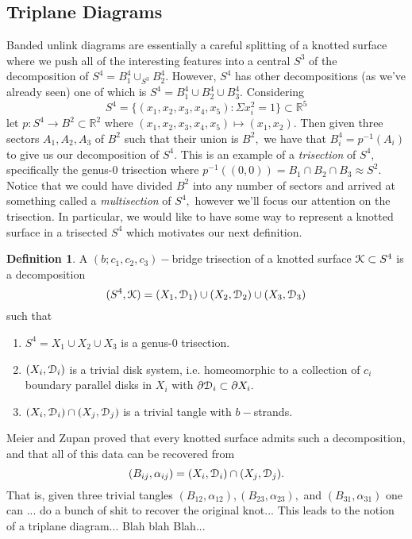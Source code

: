 \documentclass[a4paper, 12 pt, reqno]{amsart}
\theoremstyle{definition}
\newtheorem{definition}[theorem]{Definition}
\theoremstyle{remark}
\begin{document}
\subsection{Triplane Diagrams}
Banded unlink diagrams are essentially a careful splitting of a knotted surface where we push all of the interesting features into a central $S^{3}$ of the decomposition of $S^{4} = B^{4}_{1} \cup_{S^{3}} B^{4}_{2}.$ However, $S^{4}$ has other decompositions (as we've already seen) one of which is $S^{4} = B^{4}_{1} \cup B^{4}_{2} \cup B^{4}_{3}.$ Considering $$S^{4} =\{(x_{1}, x_{2}, x_{3}, x_{4}, x_{5}) : \Sigma x_{i}^{2} = 1\} \subset \mathbb{R}^{5}$$ let $p: S^{4} \rightarrow B^{2} \subset \mathbb{R}^{2}$ where $(x_{1}, x_{2}, x_{3}, x_{4}, x_{5}) \mapsto (x_{1}, x_{2}).$ Then given three sectors $A_{1}, A_{2}, A_{3}$ of $B^{2}$ such that their union is $B^{2},$ we have that $B_{i}^{4} = p^{-1}(A_{i})$ to give us our decomposition of $S^{4}.$ This is an example of a {\em trisection} of $S^{4},$ specifically the genus-0 trisection where $p^{-1}((0,0)) = B_{1} \cap B_{2} \cap B_{3} \approx S^{2}.$ Notice that we could have divided $B^{2}$ into any number of sectors and arrived at something called a {\em multisection} of $S^{4},$ however we'll focus our attention on the trisection. In particular, we would like to have some way to represent a knotted surface in a trisected $S^{4}$ which motivates our next definition.
\begin{definition}
A $(b; c_{1}, c_{2}, c_{3})-$bridge trisection of a knotted surface $\mathcal K \subset S^{4}$ is a decomposition $$(S^{4}, \mathcal K) = (X_{1}, \mathcal D_{1}) \cup  (X_{2}, \mathcal D_{2}) \cup  (X_{3}, \mathcal D_{3})$$ such that 
\begin{enumerate}
\item $S^{4} = X_{1} \cup X_{2} \cup X_{3}$ is a genus-0 trisection.
\item $(X_{i}, \mathcal D_{i})$ is a trivial disk system, i.e. homeomorphic to a collection of $c_{i}$ boundary parallel disks in $X_{i}$ with $\partial \mathcal D_{i} \subset \partial X_{i}.$
\item $(X_{i}, \mathcal D_{i}) \cap (X_{j}, \mathcal D_{j})$ is a trivial tangle with $b-$strands.
\end{enumerate} 
\end{definition}

Meier and Zupan proved that every knotted surface admits such a decomposition, and that all of this data can be recovered from $$(B_{ij}, \alpha_{ij}) = (X_{i}, \mathcal D_{i}) \cap (X_{j}, \mathcal D_{j}).$$ That is, given three trivial tangles $(B_{12}, \alpha_{12}), (B_{23}, \alpha_{23}),$ and $(B_{31}, \alpha_{31})$ one can ... do a bunch of shit to recover the original knot... This leads to the notion of a triplane diagram... Blah blah Blah...
\end{document}
